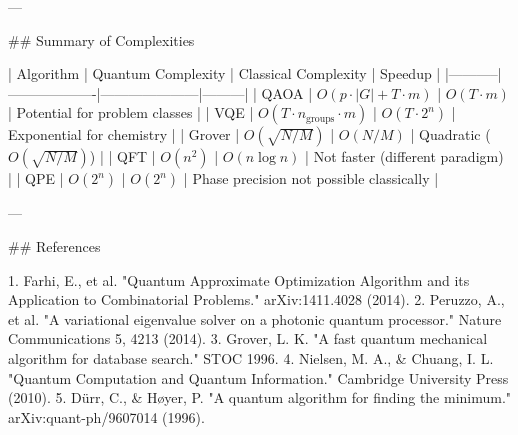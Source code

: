 ---

## Summary of Complexities

| Algorithm | Quantum Complexity | Classical Complexity | Speedup |
|-----------|-------------------|---------------------|---------|
| QAOA | $O(p \cdot |G| + T \cdot m)$ | $O(T \cdot m)$ | Potential for problem classes |
| VQE | $O(T \cdot n_{\text{groups}} \cdot m)$ | $O(T \cdot 2^n)$ | Exponential for chemistry |
| Grover | $O(\sqrt{N/M})$ | $O(N/M)$ | Quadratic ($O(\sqrt{N/M})$) |
| QFT | $O(n^2)$ | $O(n \log n)$ | Not faster (different paradigm) |
| QPE | $O(2^n)$ | $O(2^n)$ | Phase precision not possible classically |

---

## References

1. Farhi, E., et al. "Quantum Approximate Optimization Algorithm and its Application to Combinatorial Problems." arXiv:1411.4028 (2014).
2. Peruzzo, A., et al. "A variational eigenvalue solver on a photonic quantum processor." Nature Communications 5, 4213 (2014).
3. Grover, L. K. "A fast quantum mechanical algorithm for database search." STOC 1996.
4. Nielsen, M. A., & Chuang, I. L. "Quantum Computation and Quantum Information." Cambridge University Press (2010).
5. Dürr, C., & Høyer, P. "A quantum algorithm for finding the minimum." arXiv:quant-ph/9607014 (1996).
